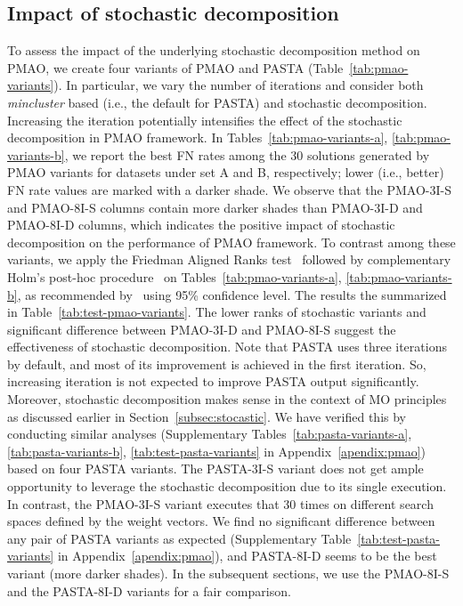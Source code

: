 \subsection{Impact of stochastic decomposition}
To assess the impact of the underlying stochastic decomposition method on PMAO, we create four variants of PMAO and PASTA (Table~\ref{tab:pmao-variants}). In particular, we vary the number of iterations and consider both \textit{mincluster} based (i.e., the default for PASTA) and stochastic decomposition. Increasing the iteration potentially intensifies the effect of the stochastic decomposition in PMAO framework. In Tables~\ref{tab:pmao-variants-a},  \ref{tab:pmao-variants-b}, we report the best FN rates among the 30 solutions generated by PMAO variants for datasets under set A and B, respectively; lower (i.e., better) FN rate values are marked with a darker shade.
We observe that the PMAO-3I-S and PMAO-8I-S columns contain more darker shades than PMAO-3I-D and PMAO-8I-D columns, which indicates the positive impact of stochastic decomposition on the performance of PMAO framework. To contrast among these variants, we apply the Friedman Aligned Ranks test~\cite{hodges2012rank} followed by complementary Holm’s post-hoc procedure~\cite{holm1979simple} on Tables~\ref{tab:pmao-variants-a},  \ref{tab:pmao-variants-b}, as recommended by~\cite{derrac2011practical, rodriguez-fdez2015stac} using 95\% confidence level. The results the summarized in Table~\ref{tab:test-pmao-variants}. The lower ranks of stochastic variants and significant difference between PMAO-3I-D and PMAO-8I-S suggest the effectiveness of stochastic decomposition. Note that PASTA uses three iterations by default, and most of its improvement is achieved in the first iteration. So, increasing iteration is not expected to improve PASTA output significantly. Moreover, stochastic decomposition makes sense in the context of MO principles as discussed earlier in Section~\ref{subsec:stocastic}. We have verified this by conducting similar analyses (Supplementary Tables~\ref{tab:pasta-variants-a}, \ref{tab:pasta-variants-b},  \ref{tab:test-pasta-variants} in Appendix~\ref{apendix:pmao}) based on four PASTA variants. The PASTA-3I-S variant does not get ample opportunity to leverage the stochastic decomposition due to its single execution.
In contrast, the PMAO-3I-S variant executes that 30 times on different search spaces defined by the weight vectors. We find no significant difference between any pair of PASTA variants as expected (Supplementary Table~\ref{tab:test-pasta-variants} in Appendix~\ref{apendix:pmao}), and PASTA-8I-D seems to be the best variant (more darker shades). In the subsequent sections, we use the PMAO-8I-S and the PASTA-8I-D variants for a fair comparison.


